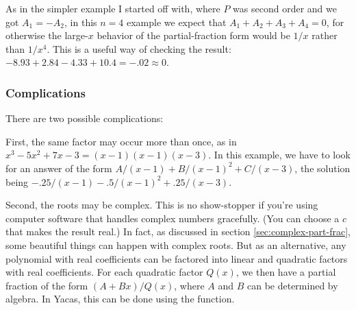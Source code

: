 As in the simpler example I started off with, where $P$ was second order
and we got $A_1=-A_2$, in this $n=4$ example we expect that $A_1+A_2+A_3+A_4=0$,
for otherwise the large-$x$ behavior of the partial-fraction form would be $1/x$ rather than $1/x^4$.
This is a useful way of checking the result: $-8.93+2.84-4.33+10.4=-.02\approx0$.

\subsubsection{Complications}
There are two possible complications:

First, the same factor may occur more than once, as in
$x^3-5x^2+7x-3=(x-1)(x-1)(x-3)$. In this example, we have to look for an answer of the form
$A/(x-1)+B/(x-1)^2+C/(x-3)$, the solution being
$-.25/(x-1)-.5/(x-1)^2+.25/(x-3)$.

Second, the roots may be complex. 
This is no show-stopper
if you're using computer software that handles complex numbers gracefully. (You can choose a $c$
that makes the result real.) 
In fact, as discussed in section \ref{sec:complex-part-frac}, some beautiful things can happen
with complex roots. But as an alternative,
any polynomial with real coefficients can be factored into linear
and quadratic factors with real coefficients. For each quadratic factor $Q(x)$, we then have a
partial fraction of the form $(A+Bx)/Q(x)$, where $A$ and $B$ can be determined by algebra.
In Yacas, this can be done using the \verb@Apart@ function.

